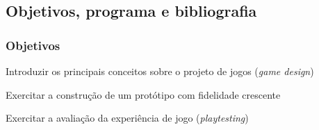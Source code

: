 \expandafter\documentclass\expandafter[table, usenames, svgnames, dvipsnames, \classopts]{beamer}
\begin{document}
\subsection{Objetivos, programa e bibliografia}

\begin{frame} 
	\frametitle{\textbf{Objetivos}}
	
	\begin{outline}[enumerate]
		\1 Introduzir os principais conceitos sobre o projeto de jogos (\textit{game design})
	    
		\vspace{1em}
	    
		\1 Exercitar a construção de um protótipo com fidelidade crescente
		
		\vspace{1em}
			    
		\1 Exercitar a avaliação da experiência de jogo (\textit{playtesting})
	\end{outline}
	
\end{frame}
\end{document}
